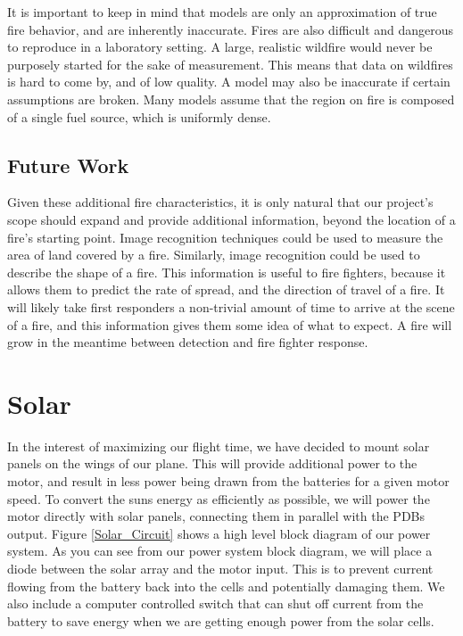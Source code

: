 \documentclass[12pt,journal,compsoc]{IEEEtran}
\begin{document}
It is important to keep in mind that models are only an approximation of true fire behavior, and are inherently inaccurate. Fires are also difficult and dangerous to reproduce in a laboratory setting. A large, realistic wildfire would never be purposely started for the sake of measurement. This means that data on wildfires is hard to come by, and of low quality. A model may also be inaccurate if certain assumptions are broken. Many models assume that the region on fire is composed of a single fuel source, which is uniformly dense.

\subsection{Future Work}
Given these additional fire characteristics, it is only natural that our project's scope should expand and provide additional information, beyond the location of a fire's starting point. Image recognition techniques could be used to measure the area of land covered by a fire. Similarly, image recognition could be used to describe the shape of a fire. This information is useful to fire fighters, because it allows them to predict the rate of spread, and the direction of travel of a fire. It will likely take first responders a non-trivial amount of time to arrive at the scene of a fire, and this information gives them some idea of what to expect. A fire will grow in the meantime between detection and fire fighter response. 

\section{Solar}
In the interest of maximizing our flight time, we have decided to mount solar panels on the wings of our plane. This will provide additional power to the motor, and result in less power being drawn from the batteries for a given motor speed. To convert the suns energy as efficiently as possible, we will power the motor directly with solar panels, connecting them in parallel with the PDBs output. Figure \ref{Solar_Circuit} shows a high level block diagram of our power system. As you can see from our power system block diagram, we will place a diode between the solar array and the motor input. This is to prevent current flowing from the battery back into the cells and potentially damaging them. We also include a computer controlled switch that can shut off current from the battery to save energy when we are getting enough power from the solar cells.
\end{document}
